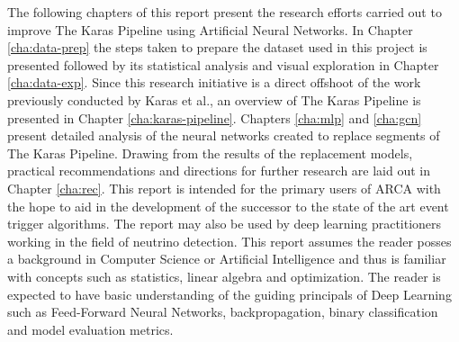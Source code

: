 The following chapters of this report present the research efforts
carried out to improve The Karas Pipeline using Artificial Neural
Networks. In Chapter \ref{cha:data-prep} the steps taken to prepare
the dataset used in this project is presented followed by its
statistical analysis and visual exploration in Chapter
\ref{cha:data-exp}. Since this research initiative is a direct
offshoot of the work previously conducted by Karas et al., an overview
of The Karas Pipeline is presented in Chapter
\ref{cha:karas-pipeline}. Chapters \ref{cha:mlp} and \ref{cha:gcn}
present detailed analysis of the neural networks created to replace
segments of The Karas Pipeline. Drawing from the results of the
replacement models, practical recommendations and directions for
further research are laid out in Chapter \ref{cha:rec}. This report is
intended for the primary users of ARCA with the hope to aid in the
development of the successor to the state of the art event trigger
algorithms. The report may also be used by deep learning practitioners
working in the field of neutrino detection. This report assumes the
reader posses a background in Computer Science or Artificial
Intelligence and thus is familiar with concepts such as statistics,
linear algebra and optimization. The reader is expected to have basic
understanding of the guiding principals of Deep Learning such as
Feed-Forward Neural Networks, backpropagation, binary classification
and model evaluation metrics.

